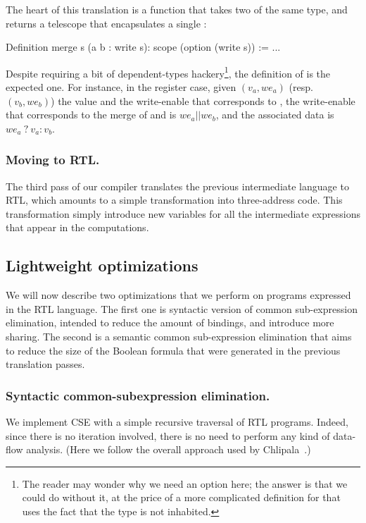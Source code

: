 \documentclass{llncs}
\begin{document}
The heart of this translation is a  function that takes
two  of the same type, and returns a telescope that
encapsulates a single : 
\begin{coq}
Definition merge s (a b : write s): scope (option (write s)) := ...   
\end{coq}
Despite requiring a bit of dependent-types hackery\footnote{The
  reader may wonder why we need an option here; the answer is that we
  could do without it, at the price of a more complicated definition
  for  that uses the fact that the type
%
  \mbox{} is not inhabited.}, the definition of
 is the expected one.
%
For instance, in the register case, given $(v_a,we_a)$ (resp. $(v_b,
we_b)$) the value and the write-enable that corresponds to ,
the write-enable that corresponds to the merge of  and
 is $we_a || we_b$, and the associated data is \mbox{$we_a~?~v_a :
v_b$}.

\subsubsection{Moving to RTL.} The third pass of our compiler translates
the previous intermediate language to RTL, which amounts to a simple
transformation into three-address code. This transformation simply
introduce new variables for all the intermediate expressions that
appear in the computations. 

\subsection{Lightweight optimizations}
We will now describe two optimizations that we perform on programs
expressed in the RTL language. 
%
The first one is syntactic version of common sub-expression
elimination, intended to reduce the amount of bindings, and introduce
more sharing. 
%
The second is a semantic common sub-expression elimination that aims
to reduce the size of the Boolean formula that were generated in the
previous translation passes.

\subsubsection{Syntactic common-subexpression elimination.}
We implement CSE with a simple recursive traversal of RTL
programs. Indeed, since there is no iteration involved, there is no
need to perform any kind of data-flow analysis. (Here we follow the
overall approach used by Chlipala~\cite{DBLP:conf/popl/Chlipala10}.)
\end{document}
